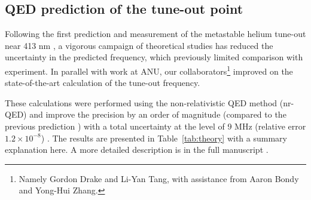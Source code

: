 \subsection*{QED prediction of the tune-out point}
\label{sec:to_theory}
	Following the first prediction \cite{Mitroy13} and measurement  of the metastable helium  tune-out near 413 nm \cite{Henson15}, a vigorous campaign of theoretical studies \cite{Zhang16,ManaloThesis,Drake19,Zhang19, Pachucki19} has reduced the uncertainty in the predicted frequency, which previously limited comparison with experiment. In parallel with work at ANU, our collaborators\footnote{Namely Gordon Drake and Li-Yan Tang, with assistance from Aaron Bondy and Yong-Hui Zhang.} improved on the state-of-the-art calculation \cite{Zhang19} of the tune-out frequency.

	These calculations were performed using the non-relativistic QED method (nr-QED) and improve the precision by an order of magnitude (compared to the previous prediction \cite{Mitroy13}) with a total uncertainty at the level of 9 MHz (relative error $1.2\times10^{-8}$) . 
	The results are presented in Table~\ref{tab:theory} with a summary explanation here. A more detailed description is in the full manuscript \cite{Henson22}.
	
